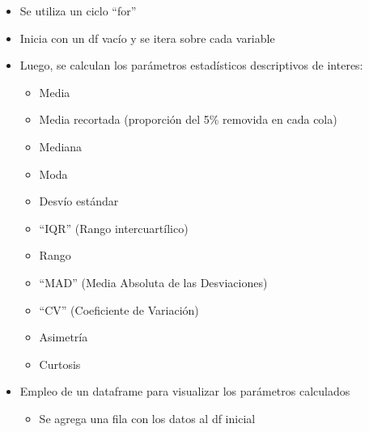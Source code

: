\documentclass[11pt]{article}
\providecommand{\tightlist}{%
      \setlength{\itemsep}{0pt}\setlength{\parskip}{0pt}}
\begin{document}
    \begin{itemize}
\tightlist
\item
  Se utiliza un ciclo ``for''
\item
  Inicia con un df vacío y se itera sobre cada variable
\item
  Luego, se calculan los parámetros estadísticos descriptivos de
  interes:

  \begin{itemize}
  \tightlist
  \item
    Media
  \item
    Media recortada (proporción del 5\% removida en cada cola)
  \item
    Mediana
  \item
    Moda
  \item
    Desvío estándar
  \item
    ``IQR'' (Rango intercuartílico)
  \item
    Rango
  \item
    ``MAD'' (Media Absoluta de las Desviaciones)
  \item
    ``CV'' (Coeficiente de Variación)
  \item
    Asimetría
  \item
    Curtosis
  \end{itemize}
\item
  Empleo de un dataframe para visualizar los parámetros calculados

  \begin{itemize}
  \tightlist
  \item
    Se agrega una fila con los datos al df inicial
  \end{itemize}
\end{itemize}
\end{document}
